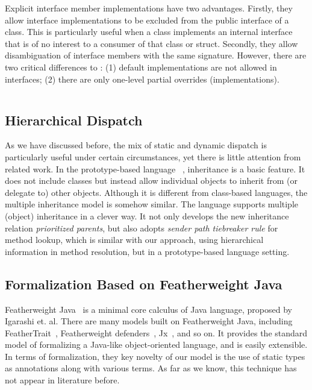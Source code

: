 Explicit interface member implementations have two advantages.
Firstly, they allow interface implementations to be excluded 
from the public interface of a class. This is particularly useful when a class implements an internal 
interface that is of no interest to a consumer of that class or struct.
Secondly, they allow disambiguation of interface members with the 
same signature. However, there are two critical differences to \MIM{}:
(1) default implementations are not allowed in \csharp{} interfaces; 
(2) there are only one-level partial overrides (implementations).

\begin{lstlisting}
\end{lstlisting}

\subsection{Hierarchical Dispatch}
As we have discussed before, the mix of static and dynamic dispatch is particularly useful under certain circumstances,
yet there is little attention from related work. In the prototype-based language \self~\cite{Chambers1991}, inheritance is a basic feature.
It does not include classes but instead allow individual objects to inherit from (or delegate to) other objects. 
Although it is different from class-based languages, the multiple inheritance model is somehow similar. The \self{}
language supports multiple (object) inheritance in a clever way. It not only develops the new inheritance
relation \emph{prioritized parents}, but also adopts \emph{sender path tiebreaker rule} for method lookup, which is similar with our approach, using hierarchical information in method resolution, but in a prototype-based language setting.


\subsection{Formalization Based on Featherweight Java}
Featherweight Java~\cite{Igarashi01FJ} is a minimal core calculus of Java language, proposed by Igarashi et. al. There are
many models built on
Featherweight Java, including FeatherTrait~\cite{Liquori08ftj}, Featherweight defenders~\cite{goetz12fdefenders}, Jx~\cite{Nystrom2004}, and so on.
It provides the standard model of formalizing a Java-like object-oriented language, and 
is easily extensible. In terms of formalization, they key novelty of our model is the use of 
static types as annotations along with various terms. As far as we know, this technique has not appear in literature before.








